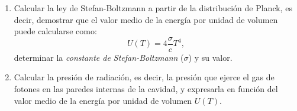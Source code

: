 \documentclass[a4paper,11pt]{article}
\begin{document}
\begin{enumerate}[label=(\alph*),
                  leftmargin=2\parindent,
                  rightmargin=2\parindent]
     \item{Calcular la ley de Stefan-Boltzmann a partir de la distribución
           de Planck, es decir, demostrar que el valor medio de la energía
           por unidad de volumen puede calcularse como:
           $$ U(T) = 4 \frac{\sigma}{c} T^4, $$
           determinar la \emph{constante de Stefan-Boltzmann} ($\sigma$) y su
           valor.
           }

     \item{Calcular la presión de radiación, es decir, la presión que
           ejerce el gas de fotones en las paredes internas de la cavidad, y
           expresarla en función del valor medio de la energía por unidad de
           volumen $U(T)$.
           }

\end{enumerate}
\end{document}
